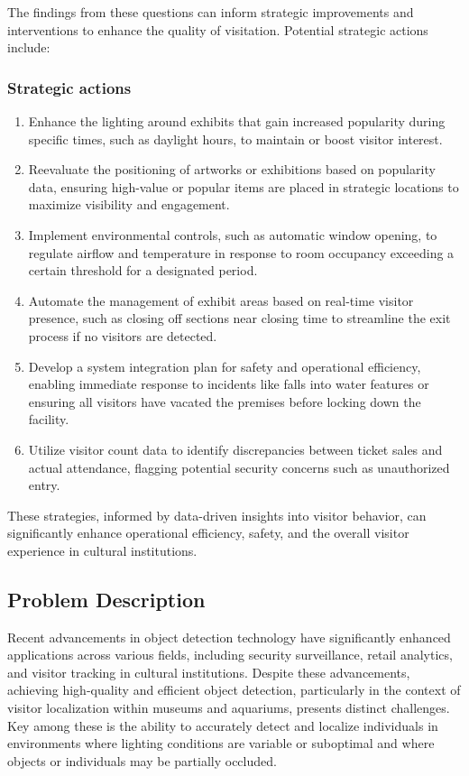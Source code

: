 The findings from these questions can inform strategic improvements and interventions to enhance the quality of visitation. Potential strategic actions include:
\subsubsection*{Strategic actions}
\begin{enumerate}
    \item Enhance the lighting around exhibits that gain increased popularity during specific times, such as daylight hours, to maintain or boost visitor interest.
    \item Reevaluate the positioning of artworks or exhibitions based on popularity data, ensuring high-value or popular items are placed in strategic locations to maximize visibility and engagement.
    \item Implement environmental controls, such as automatic window opening, to regulate airflow and temperature in response to room occupancy exceeding a certain threshold for a designated period.
    \item Automate the management of exhibit areas based on real-time visitor presence, such as closing off sections near closing time to streamline the exit process if no visitors are detected.
    \item Develop a system integration plan for safety and operational efficiency, enabling immediate response to incidents like falls into water features or ensuring all visitors have vacated the premises before locking down the facility.
    \item Utilize visitor count data to identify discrepancies between ticket sales and actual attendance, flagging potential security concerns such as unauthorized entry.
\end{enumerate} 

These strategies, informed by data-driven insights into visitor behavior, can significantly enhance operational efficiency, safety, and the overall visitor experience in cultural institutions.

\subsection{Problem Description}
Recent advancements in object detection technology have significantly enhanced applications across various fields, including security surveillance, retail analytics, and visitor tracking in cultural institutions. Despite these advancements, achieving high-quality and efficient object detection, particularly in the context of visitor localization within museums and aquariums, presents distinct challenges. Key among these is the ability to accurately detect and localize individuals in environments where lighting conditions are variable or suboptimal and where objects or individuals may be partially occluded.

